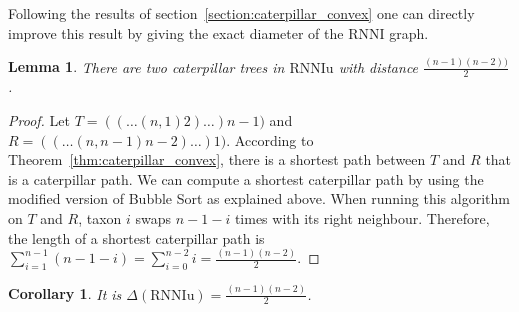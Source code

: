 \documentclass{amsart}
\newcommand{\rnni}{\mathrm{RNNI}}
\newcommand{\rnniu}{\mathrm{RNNIu}}
\newtheorem{lemma}[definition]{Lemma}
\newtheorem{corollary}[definition]{Corollary}
\begin{document}
Following the results of section~\ref{section:caterpillar_convex} one can directly improve this result by giving the exact diameter of the $\rnni$ graph.

\begin{lemma}
	There are two caterpillar trees in $\rnniu$ with distance $\frac{(n-1)(n-2))}{2}$.
	\label{conj:caterpillar_diameter}
\end{lemma}


\begin{proof}
	Let $T = (( \dots (n,1)2)\dots)n-1)$ and $R = (( \dots (n,n-1)n-2)\dots)1)$.
    According to Theorem~\ref{thm:caterpillar_convex}, there is a shortest path between $T$ and $R$ that is a caterpillar path.
    We can compute a shortest caterpillar path by using the modified version of Bubble Sort as explained above. 
    When running this algorithm on $T$ and $R$, taxon $i$ swaps $n-1-i$ times with its right neighbour.
    Therefore, the length of a shortest caterpillar path is $\sum\limits_{i=1}^{n-1}(n-1-i) = \sum\limits_{i=0}^{n-2}i = \frac{(n-1)(n-2)}{2}$.
\end{proof}

\begin{corollary}
    It is $\Delta(\rnniu) = \frac{(n-1)(n-2)}{2}$.
\end{corollary}

\end{document}
